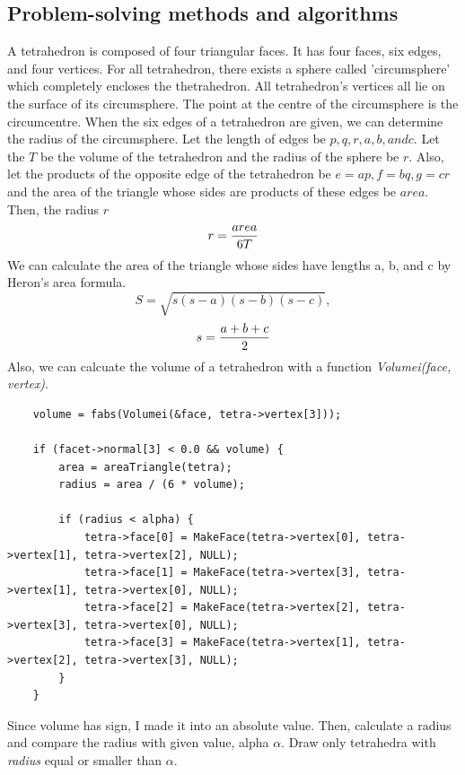 \documentclass[11pt]{article}
\begin{document}
\clearpage

\subsection{Problem-solving methods and algorithms}
A tetrahedron is composed of four triangular faces. It has four faces, six edges, and four vertices. For all tetrahedron, there exists a sphere called 'circumsphere' which completely encloses the thetrahedron. All tetrahedron's vertices all lie on the surface of its circumsphere. The point at the centre of the circumsphere is the circumcentre. When the six edges of a tetrahedron are given, we can determine the radius of the circumsphere. Let the length of edges be $p, q, r, a, b, and c$. Let the $T$ be the volume of the tetrahedron and the radius of the sphere be $r$. Also, let the products of the opposite edge of the tetrahedron be $e = ap, f=bq, g = cr$ and the area of the triangle whose sides are products of these edges be $area$. Then, the radius $r$
\begin{equation*}
r = {area\over 6T}
\end{equation*}
We can calculate the area of the triangle whose sides have lengths a, b, and c by Heron's area formula.
\begin{equation*}
S = \sqrt{s(s-a)(s-b)(s-c)},
\end{equation*}
\begin{equation*}
s = {a + b + c \over 2}
\end{equation*}
Also, we can calcuate the volume of a tetrahedron with a function \textit{ Volumei(face, vertex)}.

\begin{lstlisting}
	volume = fabs(Volumei(&face, tetra->vertex[3]));
	
	if (facet->normal[3] < 0.0 && volume) {
		area = areaTriangle(tetra);
		radius = area / (6 * volume);
		
		if (radius < alpha) {
			tetra->face[0] = MakeFace(tetra->vertex[0], tetra->vertex[1], tetra->vertex[2], NULL);
			tetra->face[1] = MakeFace(tetra->vertex[3], tetra->vertex[1], tetra->vertex[0], NULL);
			tetra->face[2] = MakeFace(tetra->vertex[2], tetra->vertex[3], tetra->vertex[0], NULL);
			tetra->face[3] = MakeFace(tetra->vertex[1], tetra->vertex[2], tetra->vertex[3], NULL);
		}
	}

\end{lstlisting}
Since volume has sign, I made it into an absolute value. Then, calculate a radius and compare the radius with given value, alpha $\alpha$. Draw only tetrahedra with \textit{radius} equal or smaller than $\alpha$.
\end{document}
